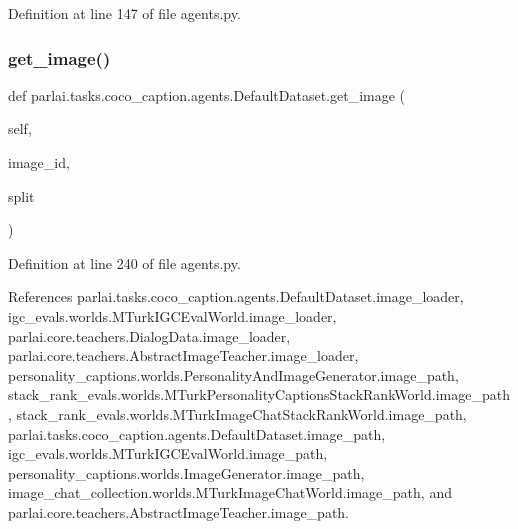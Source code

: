 Definition at line 147 of file agents.\+py.

\mbox{\label{classparlai_1_1tasks_1_1coco__caption_1_1agents_1_1DefaultDataset_ae769cbe2c9a42fc0ecc817a2baeffb77}} 
\subsubsection{\texorpdfstring{get\+\_\+image()}{get\_image()}}
{\footnotesize\ttfamily def parlai.\+tasks.\+coco\+\_\+caption.\+agents.\+Default\+Dataset.\+get\+\_\+image (\begin{DoxyParamCaption}\item[{}]{self,  }\item[{}]{image\+\_\+id,  }\item[{}]{split }\end{DoxyParamCaption})}



Definition at line 240 of file agents.\+py.



References parlai.\+tasks.\+coco\+\_\+caption.\+agents.\+Default\+Dataset.\+image\+\_\+loader, igc\+\_\+evals.\+worlds.\+M\+Turk\+I\+G\+C\+Eval\+World.\+image\+\_\+loader, parlai.\+core.\+teachers.\+Dialog\+Data.\+image\+\_\+loader, parlai.\+core.\+teachers.\+Abstract\+Image\+Teacher.\+image\+\_\+loader, personality\+\_\+captions.\+worlds.\+Personality\+And\+Image\+Generator.\+image\+\_\+path, stack\+\_\+rank\+\_\+evals.\+worlds.\+M\+Turk\+Personality\+Captions\+Stack\+Rank\+World.\+image\+\_\+path, stack\+\_\+rank\+\_\+evals.\+worlds.\+M\+Turk\+Image\+Chat\+Stack\+Rank\+World.\+image\+\_\+path, parlai.\+tasks.\+coco\+\_\+caption.\+agents.\+Default\+Dataset.\+image\+\_\+path, igc\+\_\+evals.\+worlds.\+M\+Turk\+I\+G\+C\+Eval\+World.\+image\+\_\+path, personality\+\_\+captions.\+worlds.\+Image\+Generator.\+image\+\_\+path, image\+\_\+chat\+\_\+collection.\+worlds.\+M\+Turk\+Image\+Chat\+World.\+image\+\_\+path, and parlai.\+core.\+teachers.\+Abstract\+Image\+Teacher.\+image\+\_\+path.



